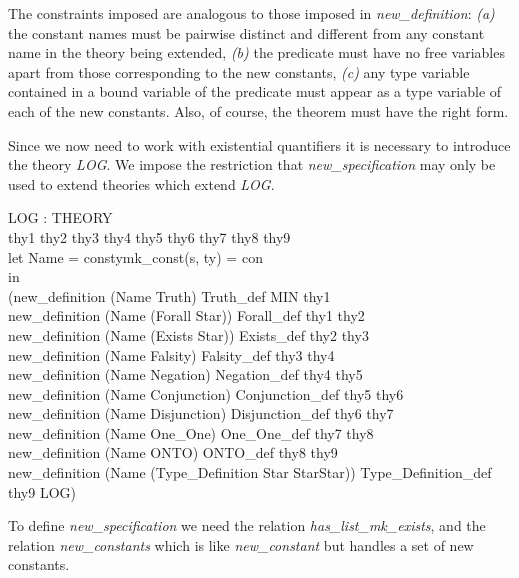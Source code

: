 \documentclass[a4paper,11pt,titlepage]{article}
\begin{document}
\begin{titlepage}
The constraints imposed are analogous to those imposed
in {\it new\_definition}: {\it (a)} the constant
names must be pairwise distinct and different from
any constant name in the theory being extended,
{\it (b)} the predicate must have
no free variables apart from those corresponding
to the new constants, {\it (c)} any type variable
contained in a bound variable of the predicate must
appear as a type variable of each of the new constants.
Also, of course, the theorem must have the right form.

Since we now need to work with existential quantifiers
it is necessary to introduce the theory {\it LOG}.
We impose the restriction that {\it new\_specification}
may only be used  to extend theories which extend {\it LOG}.
\begin{HOLConst}
\+	\PrNL{}LOG\PrNN{} : THEORY\\
\PrPH{}
\+	\MMM{\exists} thy1 thy2 thy3 thy4 thy5 thy6 thy7 thy8 thy9\MMM{\bullet}\\
\+	let Name = \MMM{\lambda}con\MMM{\bullet}\MMM{\epsilon}s\MMM{\bullet}\MMM{\exists}ty\MMM{\bullet}mk\_const(s, ty) = con\\
\+	in\\
\+	(new\_definition (Name Truth) Truth\_def MIN thy1\\
\+\MMM{\land}	new\_definition (Name (Forall Star)) Forall\_def thy1 thy2\\
\+\MMM{\land}	new\_definition (Name (Exists Star)) Exists\_def thy2 thy3\\
\+\MMM{\land}	new\_definition (Name Falsity) Falsity\_def thy3 thy4\\
\+\MMM{\land}	new\_definition (Name Negation) Negation\_def thy4 thy5\\
\+\MMM{\land}	new\_definition (Name Conjunction) Conjunction\_def thy5 thy6\\
\+\MMM{\land}	new\_definition (Name Disjunction) Disjunction\_def thy6 thy7\\
\+\MMM{\land}	new\_definition (Name One\_One) One\_One\_def thy7 thy8\\
\+\MMM{\land}	new\_definition (Name ONTO) ONTO\_def thy8 thy9\\
\+\MMM{\land}	new\_definition (Name (Type\_Definition Star StarStar)) Type\_Definition\_def thy9 LOG)\\
\end{HOLConst}

To define {\it new\_specification} we need  the relation
{\it has\_list\_mk\_exists}, and the relation {\it new\_constants}
which is like {\it new\_constant} but handles a
set of new constants.


\end{titlepage}
\end{document}
